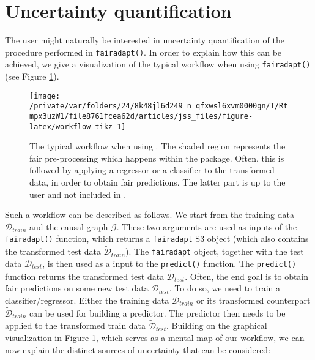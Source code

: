 \documentclass[
  nojss]{jss}
\begin{document}
\hypertarget{sec:uncq}{%
\section{Uncertainty quantification}\label{sec:uncq}}

The user might naturally be interested in uncertainty quantification of
the procedure performed in \texttt{fairadapt()}. In order to explain how
this can be achieved, we give a visualization of the typical workflow
when using \texttt{fairadapt()} (see Figure \ref{fig:workflow-tikz}).

\begin{CodeChunk}
\begin{figure}

{\centering \texttt{[image: /private/var/folders/24/8k48jl6d249\_n\_qfxwsl6xvm0000gn/T/Rtmpx3uzW1/file8761fcea62d/articles/jss\_files/figure-latex/workflow-tikz-1]} 

}

\caption{The typical workflow when using . The shaded region represents the fair pre-processing which happens within the  package. Often, this is followed by applying a regressor or a classifier to the transformed data, in order to obtain fair predictions. The latter part is up to the user and not included in .}\label{fig:workflow-tikz}
\end{figure}
\end{CodeChunk}

Such a workflow can be described as follows. We start from the training
data \(\mathcal{D}_{train}\) and the causal graph \(\mathcal{G}\). These
two arguments are used as inputs of the \texttt{fairadapt()} function,
which returns a \texttt{fairadapt} S3 object (which also contains the
transformed test data \(\widetilde{\mathcal{D}}_{train}\)). The
\texttt{fairadapt} object, together with the test data
\(\mathcal{D}_{test}\), is then used as a input to the
\texttt{predict()} function. The \texttt{predict()} function returns the
transformed test data \(\widetilde{\mathcal{D}}_{test}\). Often, the end
goal is to obtain fair predictions on some new test data
\({\mathcal{D}}_{test}\). To do so, we need to train a
classifier/regressor. Either the training data \(\mathcal{D}_{train}\)
or its transformed counterpart \(\widetilde{\mathcal{D}}_{train}\) can
be used for building a predictor. The predictor then needs to be applied
to the transformed train data \(\widetilde{\mathcal{D}}_{test}\).
Building on the graphical visualization in Figure
\ref{fig:workflow-tikz}, which serves as a mental map of our workflow,
we can now explain the distinct sources of uncertainty that can be
considered:
\end{document}
